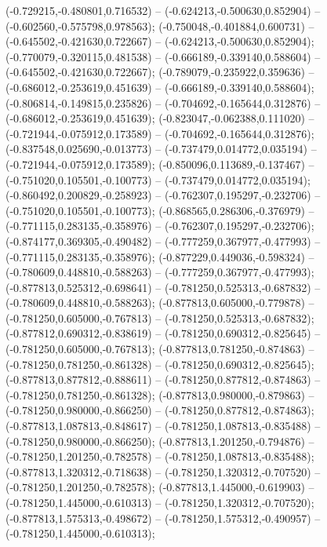  (-0.729215,-0.480801,0.716532) -- (-0.624213,-0.500630,0.852904) -- (-0.602560,-0.575798,0.978563);
 (-0.750048,-0.401884,0.600731) -- (-0.645502,-0.421630,0.722667) -- (-0.624213,-0.500630,0.852904);
 (-0.770079,-0.320115,0.481538) -- (-0.666189,-0.339140,0.588604) -- (-0.645502,-0.421630,0.722667);
 (-0.789079,-0.235922,0.359636) -- (-0.686012,-0.253619,0.451639) -- (-0.666189,-0.339140,0.588604);
 (-0.806814,-0.149815,0.235826) -- (-0.704692,-0.165644,0.312876) -- (-0.686012,-0.253619,0.451639);
 (-0.823047,-0.062388,0.111020) -- (-0.721944,-0.075912,0.173589) -- (-0.704692,-0.165644,0.312876);
 (-0.837548,0.025690,-0.013773) -- (-0.737479,0.014772,0.035194) -- (-0.721944,-0.075912,0.173589);
 (-0.850096,0.113689,-0.137467) -- (-0.751020,0.105501,-0.100773) -- (-0.737479,0.014772,0.035194);
 (-0.860492,0.200829,-0.258923) -- (-0.762307,0.195297,-0.232706) -- (-0.751020,0.105501,-0.100773);
 (-0.868565,0.286306,-0.376979) -- (-0.771115,0.283135,-0.358976) -- (-0.762307,0.195297,-0.232706);
 (-0.874177,0.369305,-0.490482) -- (-0.777259,0.367977,-0.477993) -- (-0.771115,0.283135,-0.358976);
 (-0.877229,0.449036,-0.598324) -- (-0.780609,0.448810,-0.588263) -- (-0.777259,0.367977,-0.477993);
 (-0.877813,0.525312,-0.698641) -- (-0.781250,0.525313,-0.687832) -- (-0.780609,0.448810,-0.588263);
 (-0.877813,0.605000,-0.779878) -- (-0.781250,0.605000,-0.767813) -- (-0.781250,0.525313,-0.687832);
 (-0.877812,0.690312,-0.838619) -- (-0.781250,0.690312,-0.825645) -- (-0.781250,0.605000,-0.767813);
 (-0.877813,0.781250,-0.874863) -- (-0.781250,0.781250,-0.861328) -- (-0.781250,0.690312,-0.825645);
 (-0.877813,0.877812,-0.888611) -- (-0.781250,0.877812,-0.874863) -- (-0.781250,0.781250,-0.861328);
 (-0.877813,0.980000,-0.879863) -- (-0.781250,0.980000,-0.866250) -- (-0.781250,0.877812,-0.874863);
 (-0.877813,1.087813,-0.848617) -- (-0.781250,1.087813,-0.835488) -- (-0.781250,0.980000,-0.866250);
 (-0.877813,1.201250,-0.794876) -- (-0.781250,1.201250,-0.782578) -- (-0.781250,1.087813,-0.835488);
 (-0.877813,1.320312,-0.718638) -- (-0.781250,1.320312,-0.707520) -- (-0.781250,1.201250,-0.782578);
 (-0.877813,1.445000,-0.619903) -- (-0.781250,1.445000,-0.610313) -- (-0.781250,1.320312,-0.707520);
 (-0.877813,1.575313,-0.498672) -- (-0.781250,1.575312,-0.490957) -- (-0.781250,1.445000,-0.610313);

